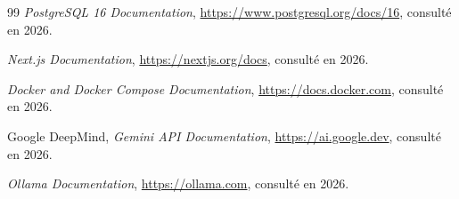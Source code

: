 \documentclass[12pt,a4paper,oneside]{report}
\begin{document}
\begin{thebibliography}{99}
 \emph{PostgreSQL 16 Documentation},
\url{https://www.postgresql.org/docs/16}, consulté en 2026.

 \emph{Next.js Documentation}, \url{https://nextjs.org/docs},
consulté en 2026.

 \emph{Docker and Docker Compose Documentation},
\url{https://docs.docker.com}, consulté en 2026.

 Google DeepMind, \emph{Gemini API Documentation},
\url{https://ai.google.dev}, consulté en 2026.

 \emph{Ollama Documentation}, \url{https://ollama.com}, consulté
en 2026.

\end{thebibliography}
\end{document}
